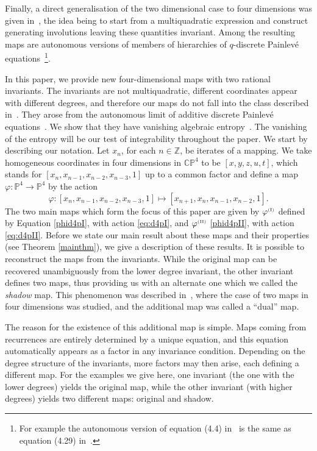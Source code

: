 \documentclass[reqno]{amsart}
\numberwithin{equation}{section}
\numberwithin{figure}{section}
\begin{document}
Finally, a direct generalisation of the two dimensional case to four
dimensions was given in~\cite{CaSa01}, the idea being to start from
a multiquadratic expression and construct generating involutions
leaving these quantities invariant. Among the resulting maps are
autonomous versions of members of hierarchies of $q$-discrete
Painlev\'e equations~\cite{Ha07}\footnote{For example the autonomous
  version of equation (4.4) in~\cite{Ha07} is the same as equation
  (4.29) in~\cite{CaSa01}.}.


In this paper, we provide new four-dimensional maps with two rational
invariants. The invariants are not multiquadratic, different
coordinates appear with different degrees, and therefore our maps do
not fall into the class described in~\cite{CaSa01}. They arose from
the autonomous limit of additive discrete Painlev\'e
equations~\cite{CrJo99}.  We show that they have vanishing algebraic
entropy~\cite{BeVi99}.{ The vanishing of the entropy will be our test
  of integrability throughout the paper}.
{  
We start by describing our notation. Let $x_n$, for each $n\in\mathbb
Z$, be iterates of a mapping.  We take homogeneous coordinates in four
dimensions in $\mathbb C \mathbb P^4$ to be $[x,y,z,u,t]$, which
stands for $[x_{n}, x_{n-1}, x_{n-2}, x_{n-3}, 1]$ up to a common
factor and define a map $\varphi:\mathbb P^4\to \mathbb P^4$ by the
action
\begin{equation}\label{genaction}
  \varphi: [x_{n}, x_{n-1}, x_{n-2}, x_{n-3}, 1]\mapsto [x_{n+1}, x_{n}, x_{n-1}, x_{n-2}, 1].
  \end{equation}
The two main maps which form the focus of this paper are given by
$\varphi^{\scriptscriptstyle (\rm I) } $ defined by Equation
\eqref{phid4pI}, with action \eqref{eq:d4pI}, and
$\varphi^{\scriptscriptstyle (\rm II) }$ \eqref{phid4pII}, with action
\eqref{eq:d4pII}. Before we state our main result about these maps and
their properties (see Theorem \ref{mainthm}), we give a description of
these results.
}
It is possible to reconstruct the maps from the invariants.  While the
original map can be recovered unambiguously from the lower degree
invariant, the other invariant defines two maps, thus providing us
with an alternate one which we called the {\em shadow} map.  This
phenomenon was described in~\cite{QuCaRo05}, where the case of two
maps in four dimensions was studied, and the additional map was called
a “dual” map.

{   The reason for the existence of this additional map is
  simple.  Maps coming from recurrences are entirely determined by a
  unique equation, and this equation automatically appears as a factor
  in any invariance condition. Depending on the degree structure of
  the invariants, more factors may then arise, each defining a
  different map. For the examples we give here, one invariant (the one
  with the lower degrees) yields the original map, while the other
  invariant (with higher degrees) yields two different maps: original
  and shadow.}
\end{document}
